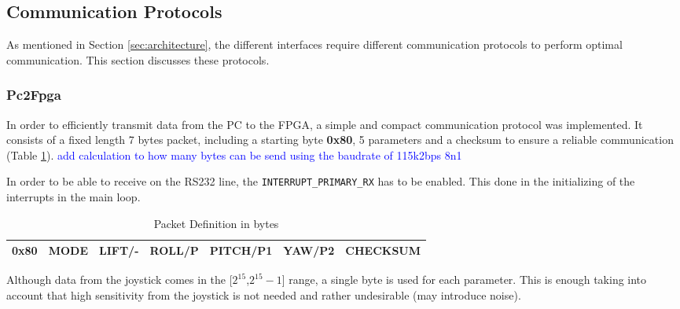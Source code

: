 \documentclass{article}
\newcommand\todo[1]{\textcolor{blue}{#1}} %
\begin{document}
\subsection{Communication Protocols}
\label{sec:communication}
As mentioned in Section \ref{sec:architecture}, the different interfaces require different communication protocols to perform optimal communication. This section discusses these protocols. 


\subsubsection{Pc2Fpga}
In order to efficiently transmit  data from the PC to the FPGA, a simple and compact communication protocol was implemented. It consists of a fixed length 7 bytes packet, including a starting byte \textbf{0x80}, 5 parameters and a checksum to ensure a reliable communication (Table \ref{tbl:PkgDefinition}). \todo{add calculation to how many bytes can be send using the baudrate of 115k2bps 8n1}

In order to be able to receive on the RS232 line, the \texttt{INTERRUPT\_PRIMARY\_RX} has to be enabled. This done in the initializing of the interrupts in the main loop. 

\begin{table}[ht]
\centering
\begin{tabular}{|c|c|c|c|c|c|c|}
\hline 
0x80 & MODE & LIFT/- & ROLL/P & PITCH/P1 & YAW/P2 & CHECKSUM \\ 
\hline 
\end{tabular} 
\caption{Packet Definition in bytes}
\label{tbl:PkgDefinition}
\end{table}

Although data from the joystick comes in the [$2^{15}$,$2^{15}-1$] range, a single byte is used for each parameter. This is enough taking into account that high sensitivity from the joystick is not needed and rather undesirable (may introduce noise).
\end{document}

